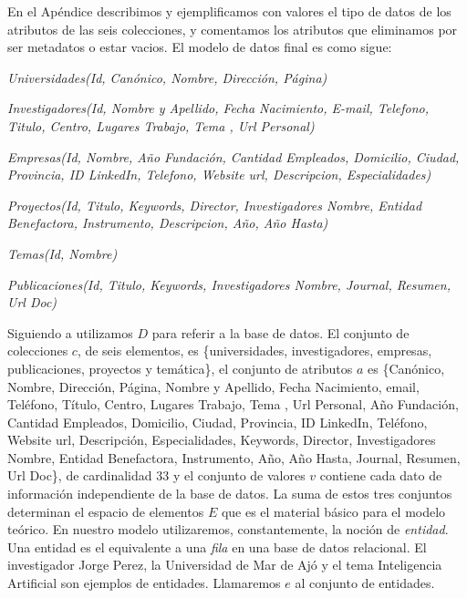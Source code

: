 En el Apéndice  describimos y ejemplificamos con valores el tipo de datos de los atributos de las seis colecciones, y comentamos los atributos que eliminamos por ser metadatos o estar vacios. El modelo de datos final es como sigue: \newline

\textit{Universidades(Id, Canónico, Nombre, Dirección, Página)} \newline

\textit{Investigadores(Id, Nombre y Apellido, Fecha Nacimiento, E-mail,   Telefono,   Titulo,  Centro, Lugares Trabajo, Tema ,  Url Personal)} \newline

\textit{Empresas(Id, Nombre, Año Fundación, Cantidad Empleados, Domicilio, Ciudad, Provincia, ID LinkedIn, Telefono, Website url, Descripcion, Especialidades)} \newline

\textit{Proyectos(Id, Titulo, Keywords, Director, Investigadores Nombre, Entidad Benefactora, Instrumento, Descripcion, Año, Año Hasta)} \newline

\textit{Temas(Id, Nombre)} \newline

\textit{Publicaciones(Id, Titulo, Keywords, Investigadores Nombre, Journal, Resumen, Url Doc)}


Siguiendo a \cite{QADB1} utilizamos $D$ para referir a la base de datos. El conjunto de colecciones $c$, de seis elementos, es \{universidades, investigadores, empresas, publicaciones, proyectos y temática\}, el conjunto de atributos $a$ es \{Canónico, Nombre, Dirección, Página, Nombre y Apellido, Fecha Nacimiento, email, Teléfono, Título, Centro, Lugares Trabajo, Tema , Url Personal, Año Fundación, Cantidad Empleados, Domicilio, Ciudad, Provincia, ID LinkedIn, Teléfono, Website url, Descripción, Especialidades, Keywords, Director, Investigadores Nombre, Entidad Benefactora, Instrumento, Año, Año Hasta, Journal, Resumen, Url Doc\}, de cardinalidad 33 y el conjunto de valores $v$ contiene cada dato de información independiente de la base de datos. La suma de estos tres conjuntos determinan el espacio de elementos $E$ que es el material básico para el modelo teórico. En nuestro modelo utilizaremos, constantemente, la noción de \textit{entidad}. Una entidad es el equivalente a una \textit{fila} en una base de datos relacional. El investigador Jorge Perez, la Universidad de Mar de Ajó y el tema Inteligencia Artificial son ejemplos de entidades. Llamaremos $e$ al conjunto de entidades.

